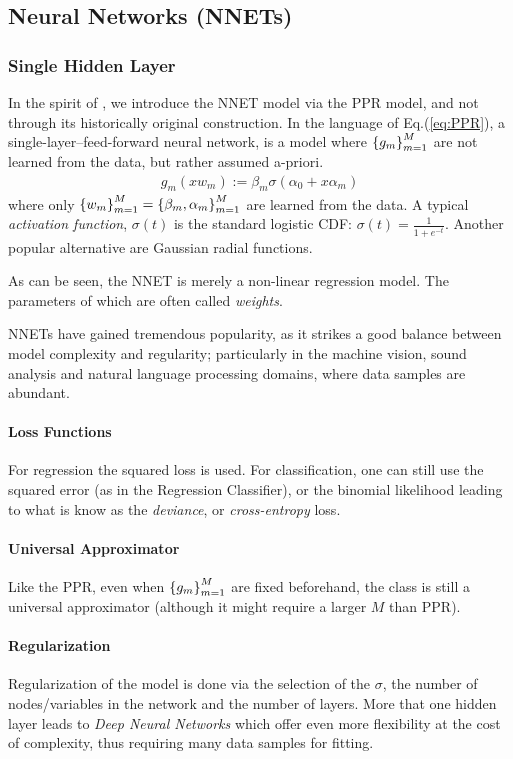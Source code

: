 \subsection{Neural Networks (NNETs)}
\subsubsection{Single Hidden Layer}
In the spirit of \cite[Section 11]{hastie_elements_2003}, we introduce the NNET model via the PPR model, and not through its historically original construction.
In the language of Eq.(\ref{eq:PPR}), a single-layer--feed-forward neural network, is a model where $\left\{ g_m \right\}_{m=1}^M$  are not learned from the data, but rather assumed a-priori. 
\begin{align*}
	g_m(x w_m):= \beta_m \sigma(\alpha_0 + x \alpha_m )
\end{align*}
where only $\left\{ w_m \right\}_{m=1}^M = \left\{ \beta_m, \alpha_m \right\}_{m=1}^M$ are learned from the data. 
A typical \emph{activation function}, $\sigma(t)$ is the standard logistic CDF: $\sigma(t)=\frac{1}{1+e^{-t}}$. Another popular alternative are Gaussian radial functions.

As can be seen, the NNET is merely a non-linear regression model.
The parameters of which are often called \emph{weights}.

NNETs have gained tremendous popularity, as it strikes a good balance between model complexity and regularity; particularly in the machine vision, sound analysis and natural language processing domains, where data samples are abundant.

\paragraph{Loss Functions}
For regression the squared loss is used. For classification, one can still use the squared error (as in the Regression Classifier), or the binomial likelihood leading to what is know as the \emph{deviance}, or \emph{cross-entropy} loss.

\paragraph{Universal Approximator}
Like the PPR, even when $\left\{ g_m \right\}_{m=1}^M$ are fixed beforehand, the class is still a universal approximator (although it might require a larger $M$ than PPR).

\paragraph{Regularization}
Regularization of the model is done via the selection of the $\sigma$, the number of nodes/variables in the network and the number of layers. More that one hidden layer leads to \emph{Deep Neural Networks} which offer even more flexibility at the cost of complexity, thus requiring many data samples for fitting.

